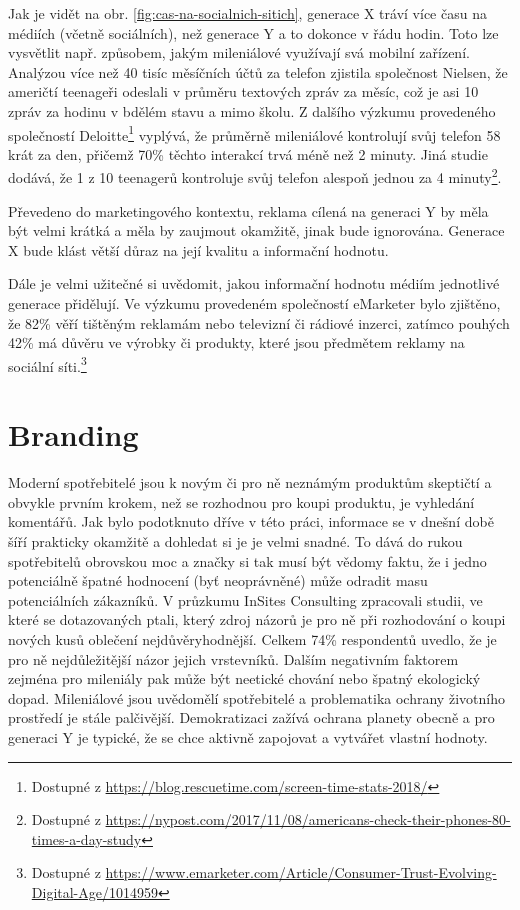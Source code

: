 
Jak je vidět na obr. \ref{fig:cas-na-socialnich-sitich}, generace X tráví více času na médiích (včetně sociálních), než generace Y a to dokonce v řádu hodin. Toto lze vysvětlit např. způsobem, jakým mileniálové využívají svá mobilní zařízení. Analýzou více než 40 tisíc měsíčních účtů za telefon zjistila společnost Nielsen, že američtí teenageři odeslali v průměru  textových zpráv za měsíc, což je asi 10 zpráv za hodinu v bdělém stavu a mimo školu.\cite[s. 33]{bergh2012coolznacky} Z dalšího výzkumu provedeného společností Deloitte\footnote{Dostupné z \url{https://blog.rescuetime.com/screen-time-stats-2018/}} vyplývá, že průměrně mileniálové kontrolují svůj telefon 58 krát za den, přičemž 70\rm \% těchto interakcí trvá méně než 2 minuty. Jiná studie dodává, že 1 z 10 teenagerů kontroluje svůj telefon alespoň jednou za 4 minuty\footnote{Dostupné z \url{https://nypost.com/2017/11/08/americans-check-their-phones-80-times-a-day-study}}.

Převedeno do marketingového kontextu, reklama cílená na generaci Y by měla být velmi krátká a měla by zaujmout okamžitě, jinak bude ignorována. Generace X bude klást větší důraz na její kvalitu a informační hodnotu.

Dále je velmi užitečné si uvědomit, jakou informační hodnotu médiím jednotlivé generace přidělují. Ve výzkumu provedeném společností eMarketer bylo zjištěno, že 82\rm \% věří tištěným reklamám nebo televizní či rádiové inzerci, zatímco pouhých 42\rm \% má důvěru ve výrobky či produkty, které jsou předmětem reklamy na sociální síti.\footnote{Dostupné z \url{https://www.emarketer.com/Article/Consumer-Trust-Evolving-Digital-Age/1014959}}


\section{Branding}
Moderní spotřebitelé jsou k novým či pro ně neznámým produktům skeptičtí a obvykle prvním krokem, než se rozhodnou pro koupi produktu, je vyhledání komentářů. Jak bylo podotknuto dříve v této práci, informace se v dnešní době šíří prakticky okamžitě a dohledat si je je velmi snadné. To dává do rukou spotřebitelů obrovskou moc a značky si tak musí být vědomy faktu, že i jedno potenciálně špatné hodnocení (byť neoprávněné) může odradit masu potenciálních zákazníků.
V průzkumu InSites Consulting zpracovali studii, ve které se dotazovaných ptali, který zdroj názorů je pro ně při rozhodování o koupi nových kusů oblečení nejdůvěryhodnější. Celkem 74\rm \% respondentů uvedlo, že je pro ně nejdůležitější názor jejich vrstevníků.\cite[s. 43]{bergh2012coolznacky}
Dalším negativním faktorem zejména pro mileniály pak může být neetické chování nebo špatný ekologický dopad. Mileniálové jsou uvědomělí spotřebitelé a problematika ochrany životního prostředí je stále palčivější. Demokratizaci zažívá ochrana planety obecně a pro generaci Y je typické, že se chce aktivně zapojovat a vytvářet vlastní hodnoty.

